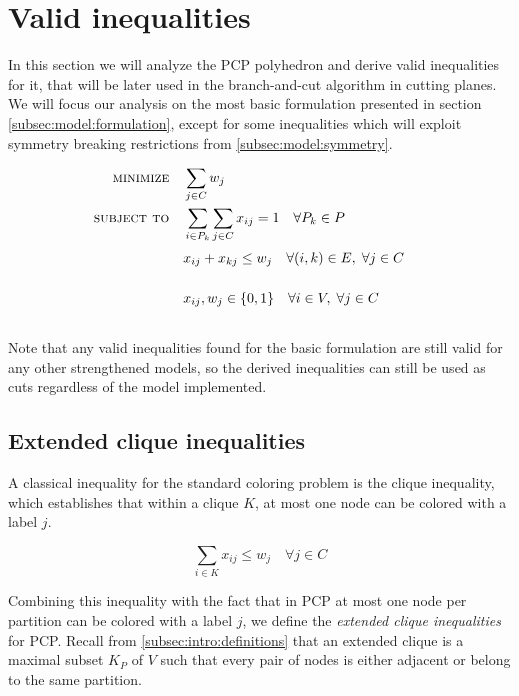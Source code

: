 
\section{Valid inequalities}
\label{sec:ineqs}

In this section we will analyze the PCP polyhedron and derive valid inequalities for it, that will be later used in the branch-and-cut algorithm in cutting planes. We will focus our analysis on the most basic formulation presented in section \ref{subsec:model:formulation}, except for some inequalities which will exploit symmetry breaking restrictions from \ref{subsec:model:symmetry}. 

\begin{align}
\text{\textsc{minimize}} \quad & \sum_{j \in C} w_j \nonumber \\
\text{\textsc{subject to}} \quad & \sum_{i \in P_k} \sum_{j \in C} x_{ij} = 1 \quad \forall P_k \in P \nonumber \\
& x_{ij} + x_{kj} \leq w_j \quad \forall (i,k) \in E, \; \forall j \in C \sumheight \nonumber \\
& x_{ij}, w_{j} \in \{0,1\} \quad \forall i \in V, \; \forall j \in C \sumheight \nonumber
\end{align}

Note that any valid inequalities found for the basic formulation are still valid for any other strengthened models, so the derived inequalities can still be used as cuts regardless of the model implemented.

\subsection{Extended clique inequalities}

A classical inequality for the standard coloring problem is the clique inequality, which establishes that within a clique $K$, at most one node can be colored with a label $j$.

\begin{equation}
\nonumber
\sum_{i \in K} x_{ij} \leq w_{j} \quad \forall j \in C
\end{equation}

Combining this inequality with the fact that in PCP at most one node per partition can be colored with a label $j$, we define the \textit{extended clique inequalities} for PCP. Recall from \ref{subsec:intro:definitions} that an extended clique is a maximal subset $K_P$ of $V$ such that every pair of nodes is either adjacent or belong to the same partition.

